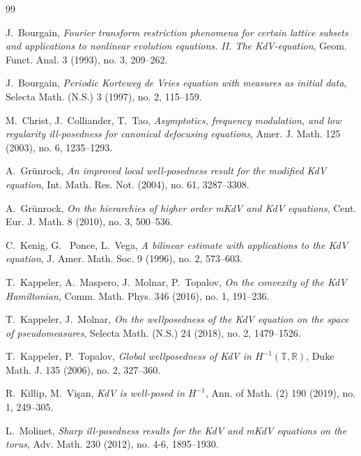 \documentclass[a4paper, 11pt]{amsart}
\newcommand{\T}{\mathbb{T}}
\newcommand{\R}{\mathbb{R}}
\theoremstyle{plain}
\theoremstyle{definition}
\theoremstyle{remark}
\newcommand{\5}{\text{V}}
\numberwithin{equation}{section}
\theoremstyle{mytheoremstyle} \newtheorem{nota}[thm]{Remark}
\theoremstyle{mytheoremstyle} \newtheorem{exemplo}[thm]{Example}
\begin{document}
\begin{thebibliography}{99}

J.~Bourgain,
\textit{Fourier transform restriction phenomena for certain lattice subsets and applications to nonlinear evolution equations. II. The KdV-equation}, 
Geom. Funct. Anal. 3 (1993), no. 3, 209--262.

J.~Bourgain, 
\textit{Periodic Korteweg de Vries equation with measures as initial data}, Selecta Math. (N.S.) 3 (1997), no. 2, 115--159.

M.~Christ, J.~Colliander, T.~Tao, 
\textit{Asymptotics, frequency modulation, and low regularity ill-posedness for canonical defocusing equations}, 
Amer. J. Math. 125 (2003), no. 6, 1235--1293.


A.~Gr\"unrock,
\textit{An improved local well-posedness result for the modified KdV equation}, Int. Math. Res. Not. (2004), no. 61, 3287--3308.

A.~Gr\"unrock,
\textit{On the hierarchies of higher order mKdV and KdV equations}, 
Cent. Eur. J. Math. 8 (2010), no. 3, 500--536.

C.~Kenig, G.~ Ponce, L.~Vega, 
\textit{A bilinear estimate with applications to the KdV equation}, J. Amer. Math. Soc. 9 (1996), no. 2, 573--603.

T.~Kappeler, A.~Maspero, J.~Molnar, P.~Topalov, 
\textit{On the convexity of the KdV Hamiltonian}, 
Comm. Math. Phys. 346 (2016), no. 1, 191--236.

T.~Kappeler, J.~Molnar, 
\textit{On the wellposedness of the KdV equation on the space of pseudomeasures}, Selecta Math. (N.S.) 24 (2018), no. 2, 1479--1526.


T.~Kappeler, P.~Topalov, 
\textit{Global wellposedness of KdV in $H^{-1}(\T,\R)$}, Duke Math. J. 135 (2006), no. 2, 327--360.

R.~Killip, M.~Vi\c{s}an, 
\textit{KdV is well-posed in $H^{-1}$}, Ann. of Math. (2) 190 (2019), no. 1, 249--305.


L.~Molinet, 
\textit{Sharp ill-posedness results for the KdV and mKdV equations on the torus}, 
Adv. Math. 230 (2012), no. 4-6, 1895--1930.


\end{thebibliography}
\end{document}
